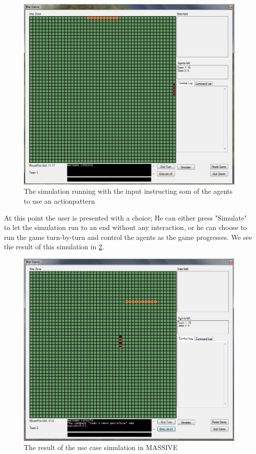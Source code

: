 \begin{figure}%
\begin{center}
\includegraphics[width=\columnwidth]{Images/massive_small.png}%
\caption{The simulation running with the input instructing som of the agents to use an actionpattern}%
\label{fig:runninggame}%
\end{center}
\end{figure}

At this point the user is presented with a choice; He can either press "Simulate" to let the simulation run to an end without any interaction, or he can choose to run the game turn-by-turn and control the agents as the game progresses. We see the result of this simulation in \ref{fig:winner}.

\begin{figure}%
\begin{center}
\includegraphics[width=\columnwidth]{Images/massive_patrollow.png}%
\caption{The result of the use case simulation in MASSIVE}%
\label{fig:winner}%
\end{center}
\end{figure}

